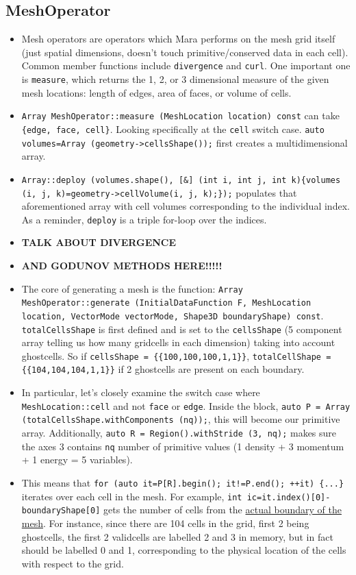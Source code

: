 \documentclass{article}
\begin{document}
\subsection{MeshOperator}
\begin{itemize}
	\item Mesh operators are operators which Mara performs on the mesh grid itself (just spatial dimensions, doesn't touch primitive/conserved data in each cell). Common member functions include \texttt{divergence} and \texttt{curl}. One important one is \texttt{measure}, which returns the 1, 2, or 3 dimensional measure of the given mesh locations: length of edges, area of faces, or volume of cells.
	\item \texttt{Array MeshOperator::measure (MeshLocation location) const} can take \texttt{\{edge, face, cell\}}. Looking specifically at the \texttt{cell} switch case. \texttt{auto volumes=Array (geometry->cellsShape());} first creates a multidimensional array. 
	\item \texttt{Array::deploy (volumes.shape(), [\&] (int i, int j, int k)\{volumes (i, j, k)=geometry->cellVolume(i, j, k);\});} populates that aforementioned array with cell volumes corresponding to the individual index. As a reminder, \texttt{deploy} is a triple for-loop over the indices.
	\item \textbf{TALK ABOUT DIVERGENCE} 
	\item \textbf{AND GODUNOV METHODS HERE!!!!!}
	\item The core of generating a mesh is the function:
	\texttt{Array MeshOperator::generate (InitialDataFunction F, MeshLocation location, VectorMode vectorMode, Shape3D boundaryShape) const}. \texttt{totalCellsShape} is first defined and is set to the \texttt{cellsShape} (5 component array telling us how many gridcells in each dimension) taking into account ghostcells. So if \texttt{cellsShape = \{\{100,100,100,1,1\}\}}, \texttt{totalCellShape = \{\{104,104,104,1,1\}\}} if 2 ghostcells are present on each boundary.
	\item In particular, let's closely examine the switch case where \texttt{MeshLocation::cell} and not \texttt{face} or \texttt{edge}. Inside the block, \texttt{auto P = Array (totalCellsShape.withComponents (nq));}, this will become our primitive array. Additionally, \texttt{auto R = Region().withStride (3, nq);} makes sure the axes 3 contains \texttt{nq} number of primitive values (1 density + 3 momentum + 1 energy = 5 variables). 
	\item This means that \texttt{for (auto it=P[R].begin(); it!=P.end(); ++it) \{...\}} iterates over each cell in the mesh. For example, \texttt{int ic=it.index()[0]-boundaryShape[0]} gets the number of cells from the \underline{actual boundary of the mesh}. For instance, since there are 104 cells in the grid, first 2 being ghostcells, the first 2 validcells are labelled 2 and 3 in memory, but in fact should be labelled 0 and 1, corresponding to the physical location of the cells with respect to the grid.
	  

\end{itemize}
\end{document}
